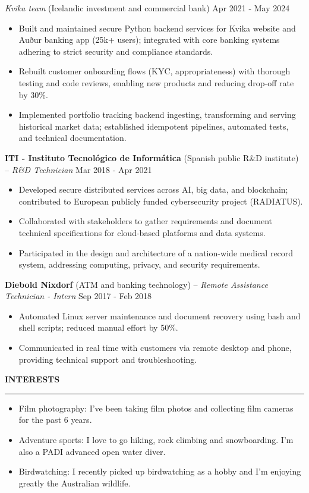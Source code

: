 \documentclass[10pt,a4paper,ragged2e]{altacv}
\renewcommand{\cvsection}[2][]{%
  \bigskip%
  {\color{heading}\large\bfseries\MakeUppercase{#2}}\\[-1ex]%
  {\color{heading}\rule{\linewidth}{0.5pt}\par}\medskip
}
\newcommand{\cvjob}[4]{%
  \textbf{#1} {\small(#4)} -- \textit{#2} \hfill {\small #3}\par\smallskip
}
\newcommand{\cvsubentry}[3]{%
  \hspace{0.5em}\textit{#1} {\small(#2)} \hfill {\small #3}\par\smallskip
}
\begin{document}
\cvsubentry{Kvika team}{Icelandic investment and commercial bank}{Apr 2021 - May 2024}
{\small
\begin{itemize}[nosep,topsep=0pt,parsep=0pt,partopsep=0pt,leftmargin=*]
\item Built and maintained secure Python backend services for Kvika website and Auður banking app (25k+ users); integrated with core banking systems adhering to strict security and compliance standards.
\item Rebuilt customer onboarding flows (KYC, appropriateness) with thorough testing and code reviews, enabling new products and reducing drop-off rate by 30\%.
\item Implemented portfolio tracking backend ingesting, transforming and serving historical market data; established idempotent pipelines, automated tests, and technical documentation.
\end{itemize}
}\medskip

\cvjob{ITI - Instituto Tecnológico de Informática}{R\&D Technician}{Mar 2018 - Apr 2021}{Spanish public R\&D institute}
{\small
\begin{itemize}[nosep,topsep=0pt,parsep=0pt,partopsep=0pt,leftmargin=*]
\item Developed secure distributed services across AI, big data, and blockchain; contributed to European publicly funded cybersecurity project (RADIATUS).
\item Collaborated with stakeholders to gather requirements and document technical specifications for cloud-based platforms and data systems.
\item Participated in the design and architecture of a nation-wide medical record system, addressing computing, privacy, and security requirements.
\end{itemize}
}\medskip

\cvjob{Diebold Nixdorf}{Remote Assistance Technician - Intern}{Sep 2017 - Feb 2018}{ATM and banking technology}
{\small
\begin{itemize}[nosep,topsep=0pt,parsep=0pt,partopsep=0pt,leftmargin=*]
\item Automated Linux server maintenance and document recovery using bash and shell scripts; reduced manual effort by 50\%.
\item Communicated in real time with customers via remote desktop and phone, providing technical support and troubleshooting.
\end{itemize}
}

\cvsection{Interests}
{\small 
\begin{itemize}[nosep,topsep=0pt,parsep=0pt,partopsep=0pt,leftmargin=*]
\item Film photography: I've been taking film photos and collecting film cameras for the past 6 years.
\item Adventure sports: I love to go hiking, rock climbing and snowboarding. I'm also a PADI advanced open water diver.
\item Birdwatching: I recently picked up birdwatching as a hobby and I'm enjoying greatly the Australian wildlife.
\end{itemize}
}
\end{document}
